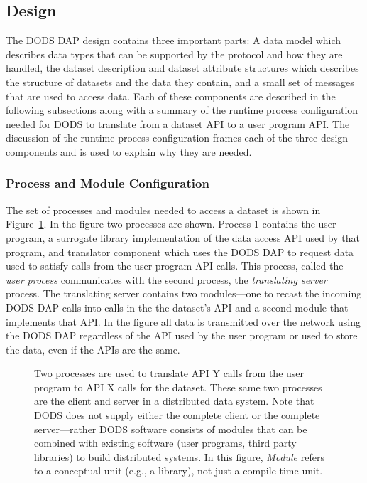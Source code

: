 \subsection{Design}
\label{design}

The DODS DAP design contains three important parts: A data model which
describes data types that can be supported by the protocol and how they are
handled, the dataset description and dataset attribute structures which
describes the structure of datasets and the data they contain, and a small
set of messages that are used to access data. Each of these components are
described in the following subsections along with a summary of the runtime
process configuration needed for DODS to translate from a dataset API to a
user program API\@. The discussion of the runtime process configuration
frames each of the three design components and is used to explain why they
are needed.

\subsubsection{Process and Module Configuration}
\label{process}

The set of processes and modules needed to access a dataset is shown in
Figure~\ref{fig:structure}. In the figure two processes are shown. Process 1
contains the user program, a surrogate library implementation of the data
access API used by that program, and translator component which uses the DODS
DAP to request data used to satisfy calls from the user-program API calls.
This process, called the {\em user process\/} communicates with the second
process, the {\em translating server\/} process.  The translating server
contains two modules---one to recast the incoming DODS DAP calls into calls
in the the dataset's API and a second module that implements that API\@. In
the figure all data is transmitted over the network using the DODS DAP
regardless of the API used by the user program or used to store the data,
even if the APIs are the same.

\begin{figure}
\centerline{}
\caption{Two processes are used to translate API Y calls from the user
  program to API X calls for the dataset. These same two processes are the
  client and server in a distributed data system. Note that DODS does not
  supply either the complete client or the complete server---rather DODS
  software consists of modules that can be combined with existing software
  (user programs, third party libraries) to build distributed systems. In
  this figure, {\em Module\/} refers to a conceptual unit (e.g., a library),
  not just a compile-time unit.}
\label{fig:structure}
\end{figure}

